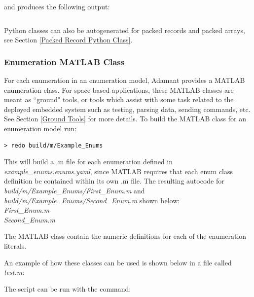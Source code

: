 and produces the following output:

\vspace{5mm} %
\inputminted{text}{../example_architecture/enum_py/output.txt}
\vspace{5mm} %

Python classes can also be autogenerated for packed records and packed arrays, see Section \ref{Packed Record Python Class}.

\subsubsection{Enumeration MATLAB Class}

For each enumeration in an enumeration model, Adamant provides a MATLAB enumeration class. For space-based applications, these MATLAB classes are meant as ``ground" tools, or tools which assist with some task related to the deployed embedded system such as testing, parsing data, sending commands, etc. See Section \ref{Ground Tools} for more details. To build the MATLAB class for an enumeration model run:

\vspace{5mm} %
\begin{verbatim}
> redo build/m/Example_Enums
\end{verbatim}
\vspace{5mm} %

This will build a .m file for each enumeration defined in \textit{example\_enums.enums.yaml}, since MATLAB requires that each enum class definition be contained within its own .m file. The resulting autocode for \textit{build/m/Example\_Enums/First\_Enum.m} and \textit{build/m/Example\_Enums/Second\_Enum.m} shown below: \\

\textit{First\_Enum.m}
 \\

\textit{Second\_Enum.m}

The MATLAB class contain the numeric definitions for each of the enumeration literals.

An example of how these classes can be used is shown below in a file called \textit{test.m}:


The script can be run with the command:

